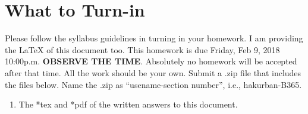 \documentclass{article}
\newcommand{\quotes}[1]{``#1''}
\begin{document}

\section*{What to Turn-in }
Please follow the syllabus guidelines in turning in your homework.  I am providing the \LaTeX{} of this document too. This homework is due Friday, Feb  9, 2018 10:00p.m. \textbf{OBSERVE THE  TIME}. Absolutely no homework will be accepted after that time. 
All the work should be your own.   Submit a .zip file that includes the files below. Name the .zip as \quotes{usename-section number}, i.e., hakurban-B365.
\begin{enumerate}
\item The *tex and *pdf of the written answers to this document.
\end{enumerate}

\end{document}
